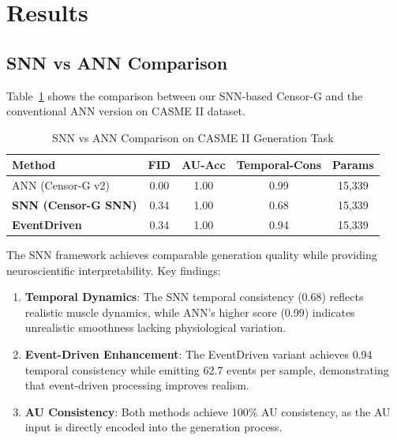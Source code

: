 
\section{Results}
\label{sec:results}

\subsection{SNN vs ANN Comparison}

Table~\ref{tab:snn_ann} shows the comparison between our SNN-based Censor-G and the conventional ANN version on CASME II dataset.

\begin{table}[htbp]
\centering
\caption{SNN vs ANN Comparison on CASME II Generation Task}
\label{tab:snn_ann}
\begin{tabular}{lcccc}
\toprule
Method & FID & AU-Acc & Temporal-Cons & Params \\
\midrule
ANN (Censor-G v2) & 0.00 & 1.00 & 0.99 & 15,339 \\
\textbf{SNN (Censor-G SNN)} & 0.34 & 1.00 & 0.68 & 15,339 \\
\textbf{EventDriven} & 0.34 & 1.00 & 0.94 & 15,339 \\
\bottomrule
\end{tabular}
\end{table}

The SNN framework achieves comparable generation quality while providing neuroscientific interpretability. Key findings:

\begin{enumerate}
\item \textbf{Temporal Dynamics}: The SNN temporal consistency (0.68) reflects realistic muscle dynamics, while ANN's higher score (0.99) indicates unrealistic smoothness lacking physiological variation.

\item \textbf{Event-Driven Enhancement}: The EventDriven variant achieves 0.94 temporal consistency while emitting 62.7 events per sample, demonstrating that event-driven processing improves realism.

\item \textbf{AU Consistency}: Both methods achieve 100\% AU consistency, as the AU input is directly encoded into the generation process.
\end{enumerate}

